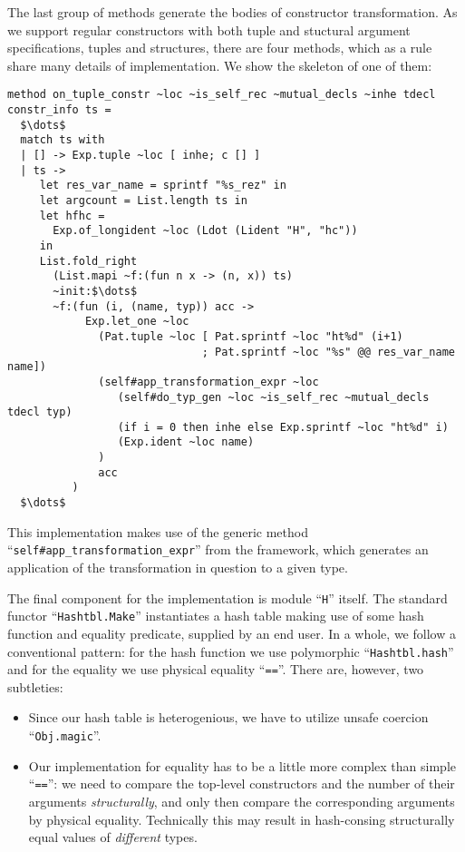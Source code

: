 The last group of methods generate the bodies of constructor transformation. As we support regular constructors with both tuple and stuctural
argument specifications, tuples and structures, there are four methods, which as a rule share many details of implementation. We show the
skeleton of one of them:

\begin{lstlisting}
method on_tuple_constr ~loc ~is_self_rec ~mutual_decls ~inhe tdecl constr_info ts =
  $\dots$ 
  match ts with
  | [] -> Exp.tuple ~loc [ inhe; c [] ]
  | ts ->
     let res_var_name = sprintf "%s_rez" in
     let argcount = List.length ts in
     let hfhc =
       Exp.of_longident ~loc (Ldot (Lident "H", "hc"))
     in
     List.fold_right
       (List.mapi ~f:(fun n x -> (n, x)) ts)
       ~init:$\dots$
       ~f:(fun (i, (name, typ)) acc ->
            Exp.let_one ~loc
              (Pat.tuple ~loc [ Pat.sprintf ~loc "ht%d" (i+1)
                              ; Pat.sprintf ~loc "%s" @@ res_var_name name])
              (self#app_transformation_expr ~loc
                 (self#do_typ_gen ~loc ~is_self_rec ~mutual_decls tdecl typ)
                 (if i = 0 then inhe else Exp.sprintf ~loc "ht%d" i)
                 (Exp.ident ~loc name)
              )
              acc
          )
  $\dots$
\end{lstlisting}

This implementation makes use of the generic method ``\lstinline{self#app_transformation_expr}'' from the framework, which generates an application of
the transformation in question to a given type.

The final component for the implementation is module ``\lstinline{H}'' itself. The standard functor ``\lstinline{Hashtbl.Make}'' instantiates a
hash table making use of some hash function and equality predicate, supplied by an end user. In a whole, we follow a conventional pattern:
for the hash function we use polymorphic ``\lstinline{Hashtbl.hash}'' and for the equality we use physical equality ``\lstinline{==}''. There are, however, two
subtleties:

\begin{itemize}
\item Since our hash table is heterogenious, we have to utilize unsafe coercion ``\lstinline{Obj.magic}''.
\item Our implementation for equality has to be a little more complex than simple ``\lstinline{==}'': we need to compare the top-level constructors and
  the number of their arguments \emph{structurally}, and only then compare the corresponding arguments by physical equality. Technically this
  may result in hash-consing structurally equal values of \emph{different} types.
\end{itemize}

